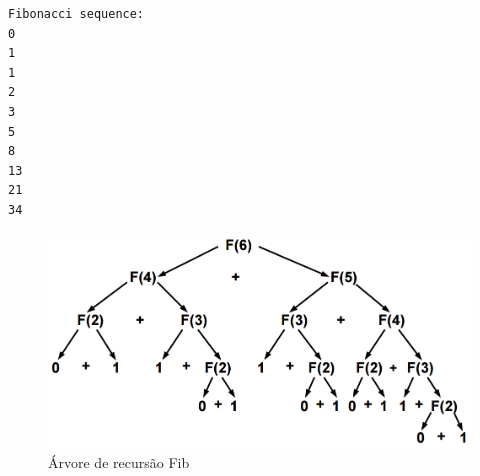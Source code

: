 \documentclass[
  letterpaper,
  DIV=11,
  numbers=noendperiod]{scrartcl}
\begin{document}
\begin{verbatim}
Fibonacci sequence:
0
1
1
2
3
5
8
13
21
34
\end{verbatim}

\begin{figure}

{\centering \includegraphics{figs/Aula03/fib_arvore.png}

}

\caption{Árvore de recursão Fib}

\end{figure}
\end{document}
